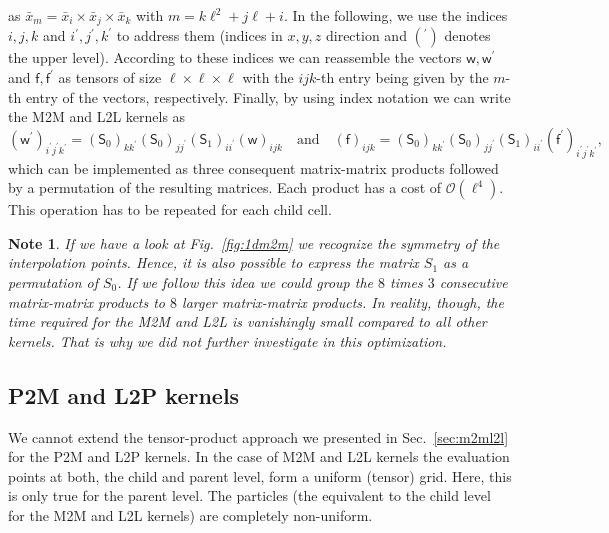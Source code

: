 \documentclass[]{article}
\newcommand{\Mat}[1]{\mathsf{#1}}  %
\theoremstyle{plain}
\newtheorem*{note}{Note}
\begin{document}
as $\bar x_m = \bar x_i \times \bar x_j \times \bar x_k$ with $m = k\ell^2 +
j\ell + i$. In the following, we use the indices $i, j, k$ and $i^\prime,
j^\prime, k^\prime$ to address them (indices in $x,y,z$ direction and
$(^\prime)$ denotes the upper level). According to these indices we can
reassemble the vectors $\Mat{w,w}^\prime$ and $\Mat{f,f}^\prime$ as tensors of
size $\ell \times \ell \times \ell$ with the $ijk$-th entry being given by the
$m$-th entry of the vectors, respectively. Finally, by using index notation we
can write the M2M and L2L kernels as
\begin{equation}
  \label{eq:indexm2ml2l}
  (\Mat{w}^\prime)_{i^\prime j^\prime k^\prime} = (\Mat{S}_0)_{kk^\prime}
  (\Mat{S}_0)_{jj^\prime} (\Mat{S}_1)_{ii^\prime} (\Mat{w})_{ijk}
  \quad \text{and} \quad
  (\Mat{f})_{ijk} = (\Mat{S}_0)_{kk^\prime} (\Mat{S}_0)_{jj^\prime}
  (\Mat{S}_1)_{ii^\prime} (\Mat{f}^\prime)_{i^\prime j^\prime k^\prime},
\end{equation}
which can be implemented as three consequent matrix-matrix products followed
by a permutation of the resulting matrices. Each product has a cost of
$\mathcal{O}(\ell^4)$. This operation has to be repeated for each child cell.

\begin{note}
  If we have a look at Fig.~\ref{fig:1dm2m} we recognize the symmetry of the
  interpolation points. Hence, it is also possible to express the matrix $S_1$
  as a permutation of $S_0$. If we follow this idea we could group the $8$
  times $3$ consecutive matrix-matrix products to $8$ larger matrix-matrix
  products. In reality, though, the time required for the M2M and L2L is
  vanishingly small compared to all other kernels. That is why we did not
  further investigate in this optimization.
\end{note}

\subsection{P2M and L2P kernels}
\label{sec:leaflevel}
We cannot extend the tensor-product approach we presented in
Sec.~\ref{sec:m2ml2l} for the P2M and L2P kernels. In the case of M2M and L2L
kernels the evaluation points at both, the child and parent level, form a
uniform (tensor) grid. Here, this is only true for the parent level. The
particles (the equivalent to the child level for the M2M and L2L kernels) are
completely non-uniform.
\end{document}
